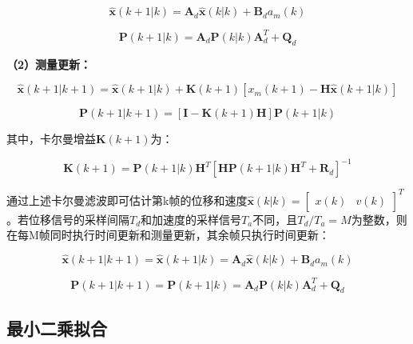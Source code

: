 \begin{equation}
\boldsymbol{\hat{x}}(k+1|k)=\boldsymbol{A}_d\boldsymbol{\hat{x}}(k|k)+\boldsymbol{B}_d a_m(k)
\end{equation}

\begin{equation}
\boldsymbol{P}(k+1|k)=\boldsymbol{A}_d \boldsymbol{P}(k|k) \boldsymbol{A}_d^T+\boldsymbol{Q}_d
\end{equation}

\textbf{（2）测量更新：}

\begin{equation}
\boldsymbol{\hat{x}}(k+1|k+1)=\boldsymbol{\hat{x}}(k+1|k)+\boldsymbol{K}(k+1)[x_m(k+1)-\boldsymbol{H}\boldsymbol{\hat{x}}(k+1|k)]
\end{equation}

\begin{equation}
\boldsymbol{P}(k+1|k+1)=[\boldsymbol{I}-\boldsymbol{K}(k+1)\boldsymbol{H}]\boldsymbol{P}(k+1|k)
\end{equation}

其中，卡尔曼增益$\boldsymbol{K}(k+1)$为：

\begin{equation}
\boldsymbol{K}(k+1)=\boldsymbol{P}(k+1|k)\boldsymbol{H}^T[\boldsymbol{H}\boldsymbol{P}(k+1|k)\boldsymbol{H}^T+\boldsymbol{R}_d]^{-1}
\end{equation}

通过上述卡尔曼滤波即可估计第k帧的位移和速度$\boldsymbol{\hat{x}}(k|k)=\begin{bmatrix}x(k)&v(k)\end{bmatrix}^T$。若位移信号的采样间隔$T_d$和加速度的采样信号$T_a$不同，且$T_d/T_a=M$为整数，则在每M帧同时执行时间更新和测量更新，其余帧只执行时间更新：

\begin{equation}
\boldsymbol{\hat{x}}(k+1|k+1)=\boldsymbol{\hat{x}}(k+1|k)=\boldsymbol{A}_d\boldsymbol{\hat{x}}(k|k)+\boldsymbol{B}_d a_m(k)
\end{equation}

\begin{equation}
\boldsymbol{P}(k+1|k+1)=\boldsymbol{P}(k+1|k)=\boldsymbol{A}_d \boldsymbol{P}(k|k) \boldsymbol{A}_d^T+\boldsymbol{Q}_d
\end{equation}

\subsection{最小二乘拟合}

